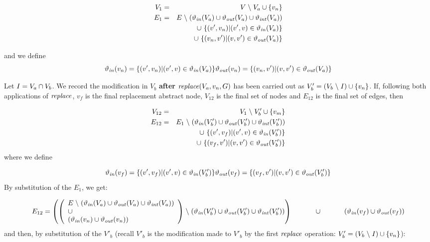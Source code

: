 \begin{eqnarray*}
  V_1 & = & V\mathrel{\backslash} V_a \cup \{v_n\}\\
  E_1 & = & E\mathrel{\backslash} ( \mathit{\vartheta_{in}}(V_a) \cup \mathit{\vartheta_{out}}(V_a) \cup \mathit{\vartheta_{int}}(V_a)) \\
  && \cup\ \{(v',v_{n})|(v',v) \in \mathit{\vartheta_{in}}(V_a) \}\\
  && \cup\ \{(v_{n},v')|(v,v') \in \mathit{\vartheta_{out}}(V_a) \}\\
\end{eqnarray*}

and we define
\[
\mathit{\vartheta_{in}}(v_n) = \{(v',v_n)|(v',v) \in \mathit{\vartheta_{in}}(V_a) \}\\
\mathit{\vartheta_{out}}(v_n) = \{(v_n,v')|(v,v') \in \mathit{\vartheta_{out}}(V_a) \}
\]

\noindent  
Let $I = V_a \cap V_b$.  We record the modification in $V_b$ \textbf{after} $\mathit{replace}(V_a,v_n,G)$ has been carried out as $V'_b = (V_b\mathrel{\backslash} I)\cup\{v_{n}\}$.
If, following both applications of $\mathit{replace}$,  $v_f$ is the final replacement abstract node, $V_{12}$ is the final set of nodes and $E_{12}$ is the final set of edges, then

\begin{eqnarray*}
  V_{12} & = & V_1 \mathrel{\backslash} V'_b \cup \{v_m\} \\
  E_{12} &  = & E_1\mathrel{\backslash} ( \mathit{\vartheta_{in}}(V'_b) \cup \mathit{\vartheta_{out}}(V'_b) \cup \mathit{\vartheta_{int}}(V'_b) )\\
  && \cup\ \{(v',v_{f})|(v',v) \in \mathit{\vartheta_{in}}(V'_b) \}\\
  && \cup\ \{(v_{f},v')|(v,v') \in \mathit{\vartheta_{out}}(V'_b) \}
\end{eqnarray*}
\noindent
where we define 

\[
 \mathit{\vartheta_{in}}(v_f) = \{(v',v_f)|(v',v) \in \mathit{\vartheta_{in}}(V'_b) \}\\
 \mathit{\vartheta_{out}}(v_f) = \{(v_f,v')|(v,v') \in \mathit{\vartheta_{out}}(V'_b) \}
 \]
 \noindent
 By substitution of the $E_1$, we get: 

\[
E_{12}  =  \left( \left(
\begin{array}{l}  E\hide(\INN(V_a) \union \OUT(V_a) \union \INT(V_a)) \\  \union \\ (\INN(v_n) \union \OUT(v_n) ) \\
\end{array} \right)
   \hide ( \INN(V'_b) \union \OUT(V'_b) \union \INT(V'_b) ) \right) \\
\hphantom{E_{12}  = \;\; }   \union\ \\
\hphantom{E_{12}  = \;\;}   (\INN(v_f) \union \OUT(v_f))
\]
\noindent
and then, by substitution of the $V'_b$ (recall $V'_b$ is the modification made to $V'_b$ by the first $\mathit{replace}$ operation: $V'_b = (V_b\mathrel{\backslash} I)\cup\{v_{n}\}$):

